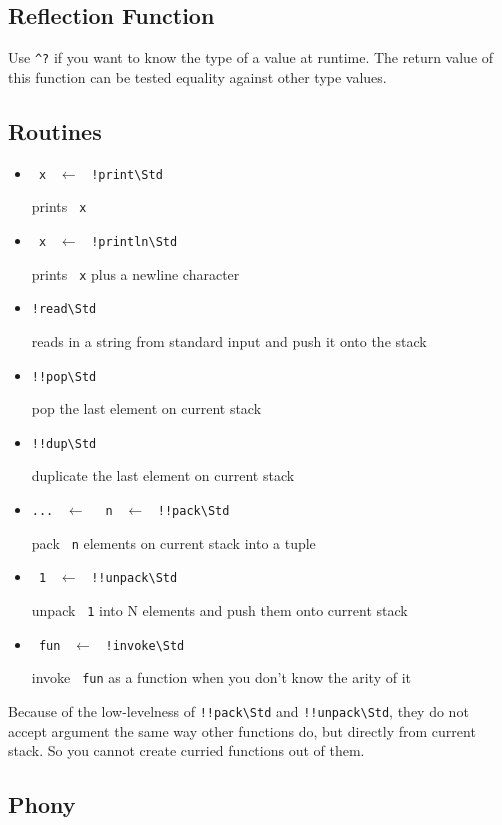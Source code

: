 \documentclass{report}
\newcommand{\mstd}[1]{\texttt{#1\textbackslash Std}}
\newcommand{\mtilde}[1]{\textasciitilde}
\newcommand{\marg}[1]{\texttt{\mtilde ~#1}}
\newcommand{\mla}[0]{~$\leftarrow$ ~}
\begin{document}
\subsection{Reflection Function}

Use \texttt{\string^?} if you want to know the type of a value at runtime. The return value of this function can be tested equality against other type values.

\subsection{Routines}

\begin{itemize}
\item \marg{x} \mla \mstd{!print}

prints \marg{x}
\item \marg{x} \mla \mstd{!println}

prints \marg{x} plus a newline character
\item \mstd{!read}

reads in a string from standard input and push it onto the stack
\item \mstd{!!pop}

pop the last element on current stack
\item \mstd{!!dup}

duplicate the last element on current stack
\item \texttt{...} \mla \marg{n} \mla \mstd{!!pack}

pack \marg{n} elements on current stack into a tuple
\item \marg1 \mla \mstd{!!unpack}

unpack \marg1 into N elements and push them onto current stack
\item \marg{fun} \mla \mstd{!invoke}

invoke \marg{fun} as a function when you don't know the arity of it
\end{itemize}

\begin{mdframed}[style=hint]
  Because of the low-levelness of \mstd{!!pack} and \mstd{!!unpack}, they do not accept argument the same way other functions do, but directly from current stack. So you cannot create curried functions out of them.
\end{mdframed}

\subsection{Phony}
\end{document}
